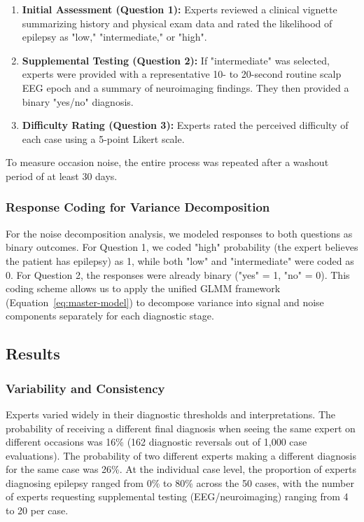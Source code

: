 \begin{enumerate}
    \item \textbf{Initial Assessment (Question 1):} Experts reviewed a clinical vignette summarizing history and physical exam data and rated the likelihood of epilepsy as "low," "intermediate," or "high".

    \item \textbf{Supplemental Testing (Question 2):} If "intermediate" was selected, experts were provided with a representative 10- to 20-second routine scalp EEG epoch and a summary of neuroimaging findings. They then provided a binary "yes/no" diagnosis.

    \item \textbf{Difficulty Rating (Question 3):} Experts rated the perceived difficulty of each case using a 5-point Likert scale.
\end{enumerate}

To measure occasion noise, the entire process was repeated after a washout period of at least 30 days.


\subsubsection*{Response Coding for Variance Decomposition}

For the noise decomposition analysis, we modeled responses to both questions as binary outcomes. For Question 1, we coded "high" probability (the expert believes the patient has epilepsy) as 1, while both "low" and "intermediate" were coded as 0. For Question 2, the responses were already binary ("yes" = 1, "no" = 0). This coding scheme allows us to apply the unified GLMM framework (Equation~\ref{eq:master-model}) to decompose variance into signal and noise components separately for each diagnostic stage.

\subsection*{Results}

\subsubsection*{Variability and Consistency}

Experts varied widely in their diagnostic thresholds and interpretations. The probability of receiving a different final diagnosis when seeing the same expert on different occasions was 16\% (162 diagnostic reversals out of 1,000 case evaluations). The probability of two different experts making a different diagnosis for the same case was 26\%. At the individual case level, the proportion of experts diagnosing epilepsy ranged from 0\% to 80\% across the 50 cases, with the number of experts requesting supplemental testing (EEG/neuroimaging) ranging from 4 to 20 per case.

